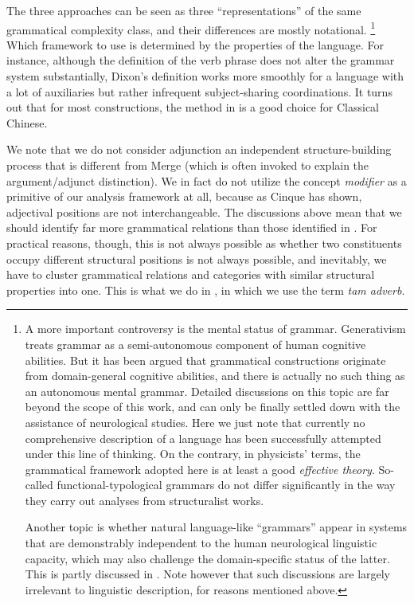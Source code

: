\documentclass[UTF8, a4paper, oneside, scheme=plain, 12pt]{ctexrep}
\newcommand*{\term}[1]{\emph{#1}}
\begin{document}
{The three approaches can be seen as three ``representations'' of the same grammatical complexity class,
and their differences are mostly notational.%
\footnote{
    A more important controversy is the mental status of grammar.
    Generativism treats grammar as a semi-autonomous component of human cognitive abilities.
    But it has been argued that grammatical constructions originate from domain-general cognitive abilities, and there is actually no such thing as an autonomous mental grammar.
    Detailed discussions on this topic are far beyond the scope of this work,
    and can only be finally settled down with the assistance of neurological studies.
    Here we just note that currently no comprehensive description of a language has been successfully attempted under this line of thinking.
    On the contrary, in physicists' terms, the grammatical framework adopted here is at least a good \term{effective theory}.
    So-called functional-typological grammars do not differ significantly in the way they carry out analyses from structuralist works.

    Another topic is whether natural language-like ``grammars'' appear in systems that are demonstrably independent to the human neurological linguistic capacity,
    which may also challenge the domain-specific status of the latter.
    This is partly discussed in .
    Note however that such discussions are largely irrelevant to linguistic description,
    for reasons mentioned above.
}
Which framework to use is determined by the properties of the language.
For instance, although the definition of the verb phrase does not alter the grammar system substantially,
Dixon's definition works more smoothly for a language with a lot of auxiliaries but rather infrequent subject-sharing coordinations.
It turns out that for most constructions, the method in \citet{cgel} is a good choice for Classical Chinese.


We note that we do not consider adjunction an independent structure-building process that is different from Merge (which is often invoked to explain the argument/adjunct distinction).
We in fact do not utilize the concept \term{modifier} as a primitive of our analysis framework at all,
because as Cinque has shown, adjectival positions are not interchangeable.
The discussions above mean that we should identify far more grammatical relations than those identified in \citet{cgel}.
For practical reasons, though, this is not always possible as whether two constituents occupy different structural positions is not always possible, 
and inevitably, we have to cluster grammatical relations and categories with similar structural properties into one.
This is what we do in ,
in which we use the term \term{\ac{tam} adverb}.

}
\end{document}
